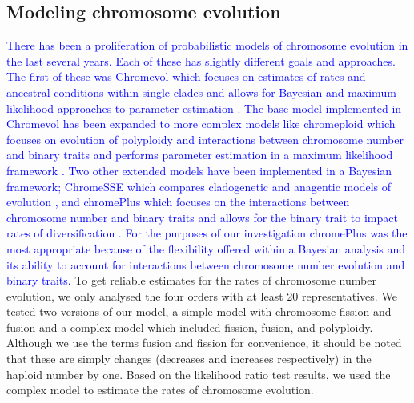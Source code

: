 \documentclass[]{rsos}%
\begin{document}
\subsection{Modeling chromosome evolution}
\textcolor{blue}{There has been a proliferation of probabilistic models of chromosome evolution in the last several years.
Each of these has slightly different goals and approaches.
The first of these was Chromevol which focuses on estimates of rates and ancestral conditions within single clades and allows for Bayesian and maximum likelihood approaches to parameter estimation \cite{mayrose2009chromevol, glick2014chromevol}.
The base model implemented in Chromevol has been expanded to more complex models like chromeploid which focuses on evolution of polyploidy and interactions between chromosome number and binary traits and performs parameter estimation in a maximum likelihood framework \cite{zenil2018chromploid}.
Two other extended models have been implemented in a Bayesian framework; ChromeSSE which compares cladogenetic and anagentic models of evolution \cite{freyman2018}, and chromePlus which focuses on the interactions between chromosome number and binary traits and allows for the binary trait to impact rates of diversification \cite{blackmon2019meiotic}. 
For the purposes of our investigation chromePlus was the most appropriate because of the flexibility offered within a Bayesian analysis and its ability to account for interactions between chromosome number evolution and binary traits\cite{blackmon2019meiotic}.}
To get reliable estimates for the rates of chromosome number evolution, we only analysed the four orders with at least 20 representatives.
We tested two versions of our model, a simple model with chromosome fission and fusion and a complex model which included fission, fusion, and polyploidy.
Although we use the terms fusion and fission for convenience, it should be noted that these are simply changes (decreases and increases respectively) in the haploid number by one.
Based on the likelihood ratio test results, we used the complex model to estimate the rates of chromosome evolution.
\end{document}
